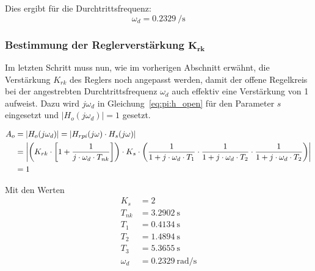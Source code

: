 Dies ergibt f\"ur die Durchtrittsfrequenz:
\begin{equation} \label{eq:pi:omega_d}
    \omega_d = \SI{0.2329}{\per\second}
\end{equation}


\subsubsection{Bestimmung der Reglerverst\"arkung $\mathbf{K_{rk}}$}

Im  letzten  Schritt  muss  nun, wie im  vorherigen  Abschnitt  erw\"ahnt, die
Verst\"arkung  $K_{rk}$   des  Reglers   noch  angepasst  werden,   damit  der
offene   Regelkreis  bei   der  angestrebten   Durchtrittsfrequenz  $\omega_d$
auch  effektiv  eine Verst\"arkung  von  1  aufweist.  Dazu  wird  $j\omega_d$
in  Gleichung~\ref{eq:pi:h_open}  f\"ur  den   Parameter  $s$  eingesetzt  und
$|H_o(j\omega_d)| = 1$ gesetzt.

\begin{gather} \label{eq:pi:A_o_set_to_one}
    \begin{split}
        A_o & = | H_o (j\omega_d) | = | H_{rpi} (j\omega) \cdot H_s (j\omega)| \\
            & = \abs*{
                    \bigg(
                        K_{rk} \cdot \biggl[ 1 + \frac{1}{j \cdot \omega_d \cdot T_{nk}} \biggr]
                    \bigg)
                    \cdot
                    K_s
                    \cdot
                    \bigg(
                            \frac{1}{1 + j \cdot \omega_d \cdot T_1}
                      \cdot \frac{1}{1 + j \cdot \omega_d \cdot T_2}
                      \cdot \frac{1}{1 + j \cdot \omega_d \cdot T_2}
                      \bigg)} \\
              & = 1
    \end{split}
\end{gather}

Mit den Werten
\begin{equation} \label{eq:pi:values}
    \begin{split}
        K_s      & = 2                    \\
        T_{nk}   & = \SI{3.2902}{\second} \\
        T_1      & = \SI{0.4134}{\second} \\
        T_2      & = \SI{1.4894}{\second} \\
        T_3      & = \SI{5.3655}{\second} \\
        \omega_d & = \SI{0.2329}{\radian\per\second}
    \end{split}
\end{equation}

